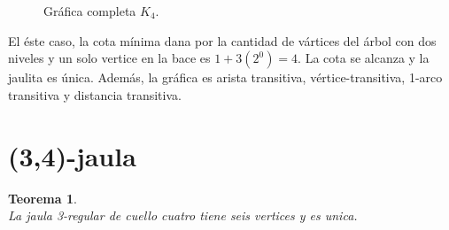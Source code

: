 \documentclass[12pt]{book}
\newtheorem{theorem}{Teorema}
\theoremstyle{definition}
\begin{document}
\begin{figure}[htb]
  \centering
  \caption{Gráfica completa $K_4$.} \label{K_4}
\end{figure}

El éste caso, la cota mínima dana por la cantidad de vártices del
árbol con dos niveles y un solo vertice en la bace es
$1+3(2^{0})=4$. La cota se alcanza y la jaulita es
única. Además, la gráfica es arista transitiva, vértice-transitiva,
1-arco transitiva y distancia transitiva.


\section{(3,4)-jaula}

\begin{theorem}\textbf{}\\
La jaula 3-regular de cuello cuatro tiene seis vertices y es unica.
\end{theorem}
\end{document}
